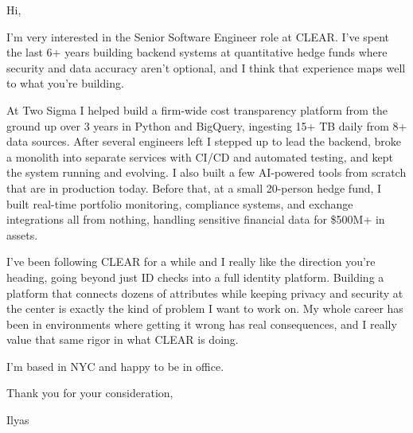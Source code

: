 \documentclass[11pt]{letter}
\begin{document}
\begin{letter}{}
\opening{Hi,}

I'm very interested in the Senior Software Engineer role at CLEAR. I've spent the last 6+ years building backend systems at quantitative hedge funds where security and data accuracy aren't optional, and I think that experience maps well to what you're building.

At Two Sigma I helped build a firm-wide cost transparency platform from the ground up over 3 years in Python and BigQuery, ingesting 15+ TB daily from 8+ data sources. After several engineers left I stepped up to lead the backend, broke a monolith into separate services with CI/CD and automated testing, and kept the system running and evolving. I also built a few AI-powered tools from scratch that are in production today. Before that, at a small 20-person hedge fund, I built real-time portfolio monitoring, compliance systems, and exchange integrations all from nothing, handling sensitive financial data for \$500M+ in assets.

I've been following CLEAR for a while and I really like the direction you're heading, going beyond just ID checks into a full identity platform. Building a platform that connects dozens of attributes while keeping privacy and security at the center is exactly the kind of problem I want to work on. My whole career has been in environments where getting it wrong has real consequences, and I really value that same rigor in what CLEAR is doing.

I'm based in NYC and happy to be in office.

Thank you for your consideration,

Ilyas
\end{letter}
\end{document}
